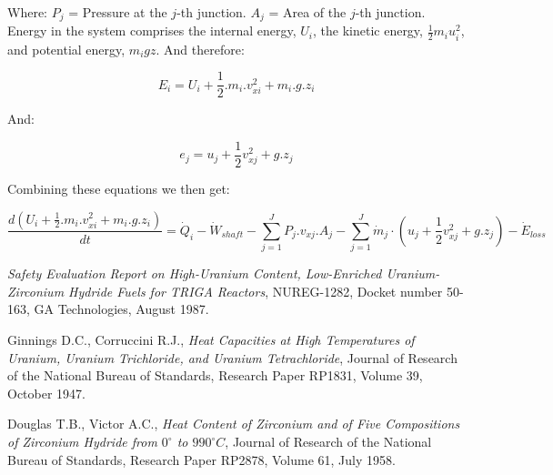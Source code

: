 \documentclass[11pt,letterpaper,titlepage]{article}
\begin{document}
\noindent 
Where: 
\newline \noindent $P_j$ \quad = Pressure at the $j$-th junction.
\newline \noindent $A_j$ \quad = Area of the $j$-th junction.
\newline
\newline
\noindent
Energy in the system comprises the internal energy, $U_i$, the kinetic energy, $\frac{1}{2}m_i u_i^2$, and potential energy, $m_i g z$. And therefore:

$$
E_i=U_i + \frac{1}{2}.m_i .v_{xi}^2 + m_i .g .z_i
$$

And:

$$
e_j=u_j + \frac{1}{2}v_{xj}^2 + g .z_j
$$

\vspace{0.25cm}
\noindent
Combining these equations we then get:

\begin{equation}
\frac{d(U_i + \frac{1}{2}.m_i .v_{xi}^2 + m_i .g .z_i)}{dt}=\dot{Q}_i - \dot{W}_{shaft} - \sum_{j=1}^J P_j.v_{xj}.A_j - \sum_{j=1}^J \dot{m}_j \cdot(u_j + \frac{1}{2}v_{xj}^2 + g .z_j)- \dot{E}_{loss}
\end{equation}
















\newpage
{}
\begin{thebibliography}{1}

	 {\em Safety Evaluation Report on High-Uranium Content, Low-Enriched Uranium-Zirconium Hydride Fuels for TRIGA Reactors}, NUREG-1282, Docket number 50-163, GA Technologies, August 1987.
	
	 Ginnings D.C., Corruccini R.J., {\em Heat Capacities at High Temperatures of Uranium, Uranium Trichloride, and Uranium Tetrachloride}, Journal of Research of the National Bureau of Standards, Research Paper RP1831, Volume 39, October 1947.
	
	 Douglas T.B., Victor A.C., {\em Heat Content of Zirconium and of Five Compositions of Zirconium Hydride from $0^{\circ}$ to $990^{\circ}C$}, Journal of Research of the National Bureau of Standards, Research Paper RP2878, Volume 61, July 1958.
	
\end{thebibliography}
\end{document}
